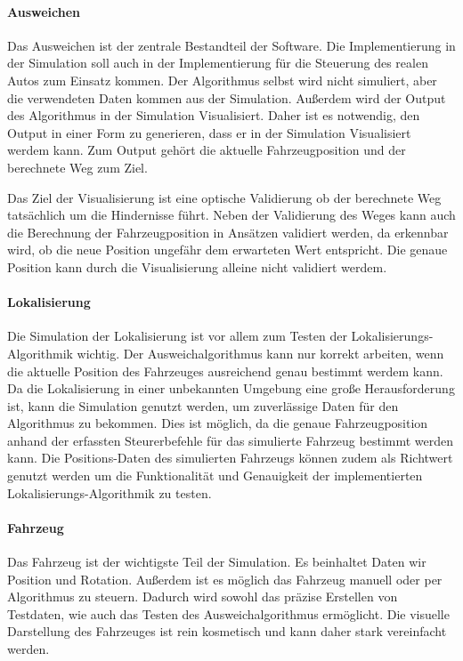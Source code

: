 \paragraph{Ausweichen}
Das Ausweichen ist der zentrale Bestandteil der Software.
Die Implementierung in der Simulation soll auch in der Implementierung für die Steuerung des realen Autos zum Einsatz kommen.
Der Algorithmus selbst wird nicht simuliert, aber die verwendeten Daten kommen aus der Simulation. 
Außerdem wird der Output des Algorithmus in der Simulation Visualisiert. 
Daher ist es notwendig, den Output in einer Form zu generieren, dass er in der Simulation Visualisiert werdem kann.
Zum Output gehört die aktuelle Fahrzeugposition und der berechnete Weg zum Ziel.

Das Ziel der Visualisierung ist eine optische Validierung ob der berechnete Weg tatsächlich um die Hindernisse führt. 
Neben der Validierung des Weges kann auch die Berechnung der Fahrzeugposition in Ansätzen validiert werden, da erkennbar wird,
ob die neue Position ungefähr dem erwarteten Wert entspricht. Die genaue Position kann durch die Visualisierung alleine nicht validiert werdem.

\paragraph{Lokalisierung}
Die Simulation der Lokalisierung ist vor allem zum Testen der Lokalisierungs-Algorithmik wichtig. 
Der Ausweichalgorithmus kann nur korrekt arbeiten, wenn die aktuelle Position des Fahrzeuges ausreichend genau bestimmt werdem kann.
Da die Lokalisierung in einer unbekannten Umgebung eine große Herausforderung ist, 
kann die Simulation genutzt werden, um zuverlässige Daten für den Algorithmus zu bekommen. 
Dies ist möglich, da die genaue Fahrzeugposition anhand der erfassten Steurerbefehle für das simulierte Fahrzeug bestimmt werden kann.
Die Positions-Daten des simulierten Fahrzeugs können zudem als Richtwert genutzt werden
um die Funktionalität und Genauigkeit der implementierten Lokalisierungs-Algorithmik zu testen.

\paragraph{Fahrzeug}
Das Fahrzeug ist der wichtigste Teil der Simulation.
Es beinhaltet Daten wir Position und Rotation.
Außerdem ist es möglich das Fahrzeug manuell oder per Algorithmus zu steuern.
Dadurch wird sowohl das präzise Erstellen von Testdaten, wie auch das Testen des Ausweichalgorithmus ermöglicht.
Die visuelle Darstellung des Fahrzeuges ist rein kosmetisch und kann daher stark vereinfacht werden. 

